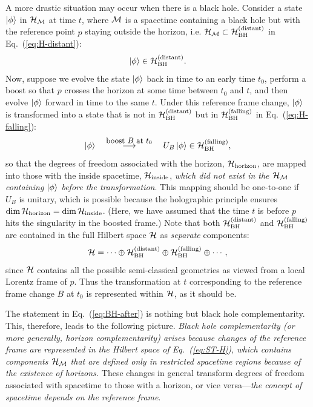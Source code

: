 \documentclass[12pt]{article}
\begin{document}
A more drastic situation may occur when there is a black hole.  Consider 
a state $\left| \phi \right>$ in ${\cal H}_{\cal M}$ at time $t$, where ${\cal M}$ 
is a spacetime containing a black hole but with the reference point 
$p$ staying outside the horizon, i.e. ${\cal H}_{\cal M} \subset 
{\cal H}_{\rm BH}^{\rm (distant)}$ in Eq.~(\ref{eq:H-distant}):
%
\begin{equation}
  \ket{\phi} \in {\cal H}_{\rm BH}^{\rm (distant)}.
\label{eq:BH-before}
\end{equation}
%
Now, suppose we evolve the state $\left| \phi \right>$ back in time to an early 
time $t_0$, perform a boost so that $p$ crosses the horizon at some 
time between $t_0$ and $t$, and then evolve $\left| \phi \right>$ forward in time 
to the same $t$.  Under this reference frame change, $\left| \phi \right>$ is 
transformed into a state that is not in ${\cal H}_{\rm BH}^{\rm (distant)}$ 
but in ${\cal H}_{\rm BH}^{\rm (falling)}$ in Eq.~(\ref{eq:H-falling}):
%
\begin{equation}
  \ket{\phi} \quad
  \stackrel{\mbox{\footnotesize boost $B$ at $t_0$}}{\longrightarrow}
  \quad U_B \ket{\phi} \in {\cal H}_{\rm BH}^{\rm (falling)},
\label{eq:BH-after}
\end{equation}
%
so that the degrees of freedom associated with the horizon, 
${\cal H}_{\rm horizon}$, are mapped into those with the inside 
spacetime, ${\cal H}_{\rm inside}$, {\it which did not exist in the 
${\cal H}_{\cal M}$ containing $\left| \phi \right>$ before the transformation}. 
This mapping should be one-to-one if $U_B$ is unitary, which is possible 
because the holographic principle ensures ${\rm dim}\,{\cal H}_{\rm horizon} 
= {\rm dim}\,{\cal H}_{\rm inside}$.  (Here, we have assumed that the 
time $t$ is before $p$ hits the singularity in the boosted frame.) 
Note that both ${\cal H}_{\rm BH}^{\rm (distant)}$ and ${\cal H}_{\rm 
BH}^{\rm (falling)}$ are contained in the full Hilbert space ${\cal H}$ 
as {\it separate} components:
%
\begin{equation}
  {\cal H} = \cdots \oplus {\cal H}_{\rm BH}^{\rm (distant)} 
    \oplus {\cal H}_{\rm BH}^{\rm (falling)} \oplus \cdots,
\label{eq:H-contain}
\end{equation}
%
since ${\cal H}$ contains all the possible semi-classical geometries as 
viewed from a local Lorentz frame of $p$.  Thus the transformation at $t$ 
corresponding to the reference frame change $B$ at $t_0$ is represented 
within ${\cal H}$, as it should be.

The statement in Eq.~(\ref{eq:BH-after}) is nothing but black hole 
complementarity.  This, therefore, leads to the following picture. 
{\it Black hole complementarity (or more generally, horizon complementarity) 
arises because changes of the reference frame are represented in 
the Hilbert space of Eq.~(\ref{eq:ST-H}), which contains components 
${\cal H}_{\cal M}$ that are defined only in restricted spacetime 
regions because of the existence of horizons.}  These changes in 
general transform degrees of freedom associated with spacetime 
to those with a horizon, or vice versa---{\it the concept of spacetime 
depends on the reference frame}.
\end{document}
